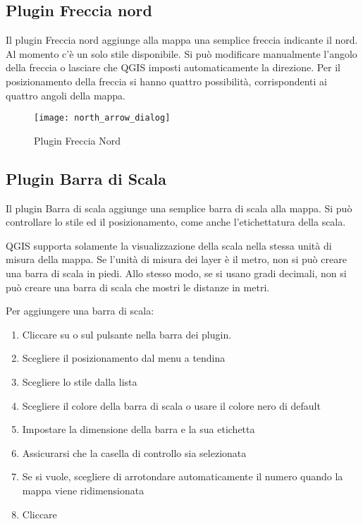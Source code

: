 \subsection{Plugin Freccia nord}\label{northarrow}

Il plugin Freccia nord aggiunge alla mappa una semplice freccia indicante il nord. Al momento 
c'è un solo stile disponibile. Si può modificare manualmente l'angolo della freccia o lasciare 
che QGIS imposti automaticamente la direzione. 
Per il posizionamento della freccia si hanno quattro possibilità, corrispondenti ai quattro angoli della mappa.

\begin{figure}[ht]
   \centering
   \texttt{[image: north\_arrow\_dialog]}
   \caption{Plugin Freccia Nord \wincaption}\label{fig:north_arrow}
\end{figure}

\subsection{Plugin Barra di Scala}\label{scalebar}

Il plugin Barra di scala aggiunge una semplice barra di scala alla mappa. Si può controllare 
lo stile ed il posizionamento, come anche l'etichettatura della scala.

QGIS supporta solamente la visualizzazione della scala nella stessa unità di misura della mappa. 
Se l'unità di misura dei layer è il metro, non si può creare una barra di scala in piedi.
Allo stesso modo, se si usano gradi decimali, non si può creare una barra di scala che 
mostri le distanze in metri.

Per aggiungere una barra di scala:

\begin{enumerate}
\item Cliccare su  \arrow {} \arrow {} 
o sul pulsante  nella barra dei plugin.
\item Scegliere il posizionamento dal menu a tendina 
\item Scegliere lo stile dalla lista 
\item Scegliere il colore della barra di scala  o usare il colore nero di default
\item Impostare la dimensione della barra e la sua etichetta 
\item Assicurarsi che la casella di controllo  sia selezionata
\item Se si vuole, scegliere di arrotondare automaticamente il numero quando la mappa viene ridimensionata 
\item Cliccare  
\end{enumerate} 

